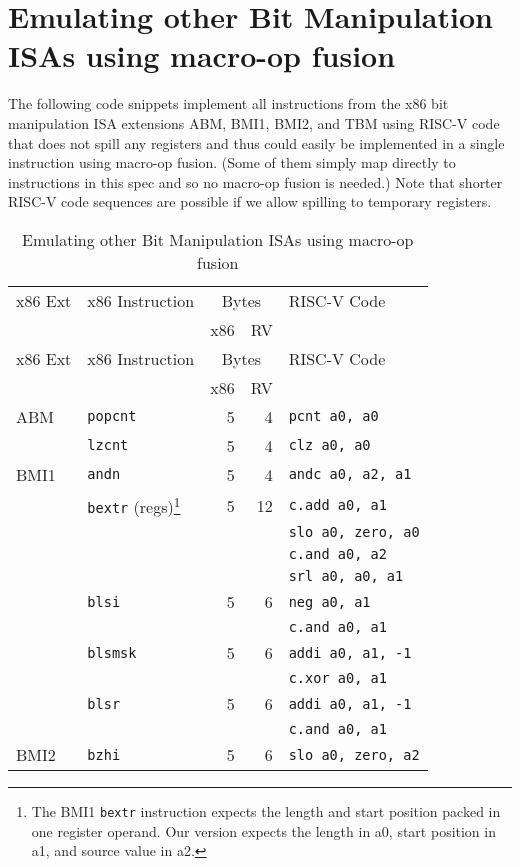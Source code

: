 \section{Emulating other Bit Manipulation ISAs using macro-op fusion}

The following code snippets implement all instructions from the x86 bit manipulation
ISA extensions ABM, BMI1, BMI2, and TBM using RISC-V code that does not spill any
registers and thus could easily be implemented in a single instruction using macro-op
fusion. (Some of them simply map directly to instructions in this spec and so no
macro-op fusion is needed.) Note that shorter RISC-V code sequences are possible if
we allow spilling to temporary registers.

\begin{longtable}[c]{@{}llrrl@{}}
\caption{Emulating other Bit Manipulation ISAs using macro-op fusion}\tabularnewline
\toprule
x86 Ext & x86 Instruction & \multicolumn{2}{c}{Bytes} & RISC-V Code\tabularnewline
        &                 & x86 & RV            &\tabularnewline
\midrule
\endfirsthead
\toprule
x86 Ext & x86 Instruction & \multicolumn{2}{c}{Bytes} & RISC-V Code\tabularnewline
        &                 & x86 & RV            &\tabularnewline
\midrule
\endhead
ABM  & {\tt popcnt}           & 5 &  4 & {\tt pcnt a0, a0}\tabularnewline
\cline{2-5}
     & {\tt lzcnt}            & 5 &  4 & {\tt clz a0, a0}\tabularnewline
\midrule
BMI1 & {\tt andn}             & 5 &  4 & {\tt andc a0, a2, a1}\tabularnewline
\cline{2-5}
     & {\tt bextr} (regs)\footnote{
         The BMI1 {\tt bextr} instruction expects the length and start position packed in one
	 register operand. Our version expects the length in a0, start position in a1, and source
	 value in a2.
                            } & 5 & 12 & {\tt c.add a0, a1}\tabularnewline
     &                        &   &    & {\tt slo a0, zero, a0}\tabularnewline
     &                        &   &    & {\tt c.and a0, a2}\tabularnewline
     &                        &   &    & {\tt srl a0, a0, a1}\tabularnewline
\cline{2-5}
     & {\tt blsi}             & 5 &  6 & {\tt neg a0, a1}\tabularnewline
     &                        &   &    & {\tt c.and a0, a1}\tabularnewline
\cline{2-5}
     & {\tt blsmsk}           & 5 &  6 & {\tt addi a0, a1, -1}\tabularnewline
     &                        &   &    & {\tt c.xor a0, a1}\tabularnewline
\cline{2-5}
     & {\tt blsr}             & 5 &  6 & {\tt addi a0, a1, -1}\tabularnewline
     &                        &   &    & {\tt c.and a0, a1}\tabularnewline
\midrule
BMI2 & {\tt bzhi}             & 5 &  6 & {\tt slo a0, zero, a2}\tabularnewline

\end{longtable}
